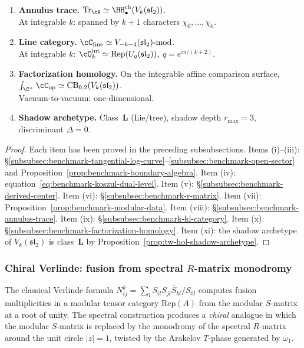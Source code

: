 \begin{theorem}
\begin{enumerate}[label=\textup{(\roman*)},nosep]
\item \textbf{Annulus trace.}
 $\mathrm{Tr}_\cA \simeq
 \HH^{\mathrm{ch}}_\bullet(V_k(\mathfrak{sl}_2))$.\\
 At integrable $k$: spanned by $k + 1$ characters
 $\chi_0, \ldots, \chi_k$.

\item \textbf{Line category.}
 $\cC_{\mathrm{line}} \simeq V_{-k-4}(\mathfrak{sl}_2)\text{-mod}$.\\
 At integrable $k$:
 $\cO_k^{\mathrm{int}} \simeq
 \mathrm{Rep}(U_q(\mathfrak{sl}_2))$,
 $q = e^{i\pi/(k+2)}$.

\item \textbf{Factorization homology.}
 On the integrable affine comparison surface,
 $\int_{\C^\times} \cC_{\mathrm{op}}
 \simeq \mathrm{CB}_{0,2}(V_k(\mathfrak{sl}_2))$.\\
 Vacuum-to-vacuum: one-dimensional.

\item \textbf{Shadow archetype.}
 Class~$\mathbf{L}$ \textup{(}Lie/tree\textup{)},
 shadow depth $r_{\max} = 3$, discriminant $\Delta = 0$.
\end{enumerate}
\end{theorem}

\begin{proof}
Each item has been proved in the preceding subsubsections.
Items (i)--(iii): \S\ref{subsubsec:benchmark-tangential-log-curve}--\ref{subsubsec:benchmark-open-sector}
and Proposition~\ref{prop:benchmark-boundary-algebra}.
Item (iv): equation~\eqref{eq:benchmark-koszul-dual-level}.
Item (v): \S\ref{subsubsec:benchmark-derived-center}.
Item (vi): \S\ref{subsubsec:benchmark-r-matrix}.
Item (vii): Proposition~\ref{prop:benchmark-modular-data}.
Item (viii): \S\ref{subsubsec:benchmark-annulus-trace}.
Item (ix): \S\ref{subsubsec:benchmark-kl-category}.
Item (x): \S\ref{subsubsec:benchmark-factorization-homology}.
Item (xi): the shadow archetype of $V_k(\mathfrak{sl}_2)$ is
class~$\mathbf{L}$ by Proposition~\ref{prop:tw-hol-shadow-archetype}.
\end{proof}


\subsubsection{Chiral Verlinde: fusion from spectral $R$-matrix monodromy}
\label{subsubsec:chiral-verlinde-spectral}

The classical Verlinde formula
$N^k_{ij} = \sum_l S_{il} S_{jl} \overline{S}_{kl} / S_{0l}$
computes fusion multiplicities in a modular tensor category
$\mathrm{Rep}(A)$ from the modular $S$-matrix at a root of unity.
The spectral construction produces a \emph{chiral} analogue in which the
modular $S$-matrix is replaced by the monodromy of the spectral
$R$-matrix around the unit circle $|z|=1$, twisted by the
Arakelov $T$-phase generated by $\omega_1$.

